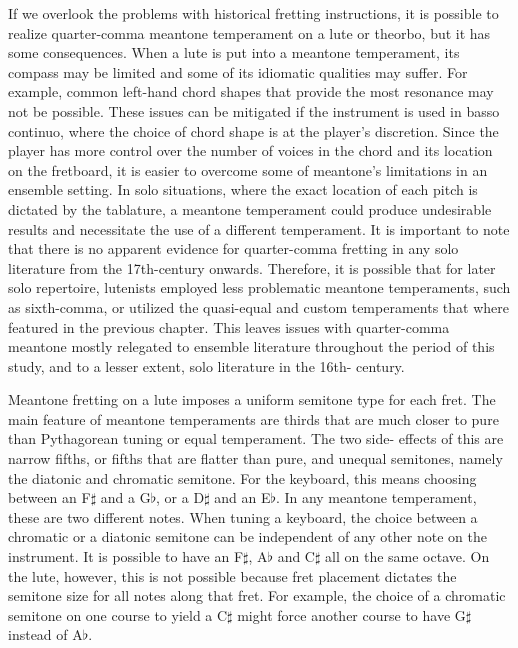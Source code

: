 If we overlook the problems with historical fretting instructions, it is
possible to realize quarter-comma meantone temperament on a lute or theorbo, but
it has some consequences.  When a lute is put into a meantone temperament, its
compass may be limited and some of its idiomatic qualities may suffer.  For
example, common left-hand chord shapes that provide the most resonance may not
be possible.  These issues can be mitigated if the instrument is used in basso
continuo, where the choice of chord shape is at the player's discretion.  Since
the player has more control over the number of voices in the chord and its
location on the fretboard, it is easier to overcome some of meantone's
limitations in an ensemble setting.  In solo situations, where the exact
location of each pitch is dictated by the tablature, a meantone temperament
could produce undesirable results and necessitate the use of a different
temperament.  It is important to note that there is no apparent evidence for
quarter-comma fretting in any solo literature from the 17th-century onwards.
Therefore, it is possible that for later solo repertoire, lutenists employed
less problematic meantone temperaments, such as sixth-comma, or utilized the
quasi-equal and custom temperaments that where featured in the previous chapter.
This leaves issues with quarter-comma meantone mostly relegated to ensemble
literature throughout the period of this study, and to a lesser extent, solo
literature in the 16th- century.

Meantone fretting on a lute imposes a uniform semitone type for each fret.
The main feature of meantone temperaments are thirds that are much
closer to pure than Pythagorean tuning or equal temperament. The two side-
effects of this are narrow fifths, or fifths that are flatter than pure, and
unequal semitones, namely the diatonic and chromatic semitone.  For the
keyboard, this means choosing between an F$\sharp$ and a G$\flat$, or a
D$\sharp$ and an E$\flat$.  In any meantone temperament, these are two different
notes.  When tuning a keyboard, the choice between a chromatic or a diatonic
semitone can be independent of any other note on the instrument. It is possible
to have an F$\sharp$, A$\flat$ and C$\sharp$ all on the same octave.  On the
lute, however, this is not possible because fret placement dictates the semitone
size for all notes along that fret. For example, the choice of a chromatic
semitone on one course to yield a C$\sharp$ might force another course to have
G$\sharp$ instead of A$\flat$.

